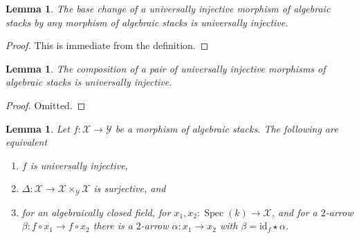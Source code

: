 \documentclass{stacks-project}
\theoremstyle{plain}
\newtheorem{lemma}[subsection]{Lemma}
\theoremstyle{definition}
\theoremstyle{remark}
\numberwithin{equation}{subsection}
\def\Spec{\mathop{\mathrm{Spec}}}
\begin{document}
\begin{lemma}
\label{lemma-base-change-universally-injective}
The base change of a universally injective morphism of algebraic stacks
by any morphism of algebraic stacks is universally injective.
\end{lemma}

\begin{proof}
This is immediate from the definition.
\end{proof}

\begin{lemma}
\label{lemma-composition-universally-injective}
The composition of a pair of universally injective morphisms of
algebraic stacks is universally injective.
\end{lemma}

\begin{proof}
Omitted.
\end{proof}

\begin{lemma}
\label{lemma-universally-injective}
Let $f : \mathcal{X} \to \mathcal{Y}$ be a morphism of algebraic stacks.
The following are equivalent
\begin{enumerate}
\item $f$ is universally injective,
\item $\Delta : \mathcal{X} \to \mathcal{X} \times_\mathcal{Y} \mathcal{X}$
is surjective, and
\item for an algebraically closed field, for
$x_1, x_2 : \Spec(k) \to \mathcal{X}$, and for a $2$-arrow
$\beta : f \circ x_1 \to f \circ x_2$ there is a
$2$-arrow $\alpha : x_1 \to x_2$ with
$\beta = \text{id}_f \star \alpha$.
\end{enumerate}
\end{lemma}
\end{document}
